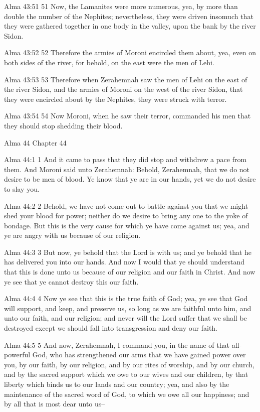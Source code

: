 Alma 43:51
 51 Now, the Lamanites were more numerous, yea, by more than
double the number of the Nephites; nevertheless, they were driven
insomuch that they were gathered together in one body in the
valley, upon the bank by the river Sidon.

Alma 43:52
 52 Therefore the armies of Moroni encircled them about, yea,
even on both sides of the river, for behold, on the east were the
men of Lehi.

Alma 43:53
 53 Therefore when Zerahemnah saw the men of Lehi on the east of
the river Sidon, and the armies of Moroni on the west of the
river Sidon, that they were encircled about by the Nephites, they
were struck with terror.

Alma 43:54
 54 Now Moroni, when he saw their terror, commanded his men that
they should stop shedding their blood.

Alma 44
Chapter 44

Alma 44:1
 1 And it came to pass that they did stop and withdrew a pace
from them. And Moroni said unto Zerahemnah: Behold, Zerahemnah,
that we do not desire to be men of blood. Ye know that ye are in
our hands, yet we do not desire to slay you.

Alma 44:2
 2 Behold, we have not come out to battle against you that we
might shed your blood for power; neither do we desire to bring
any one to the yoke of bondage. But this is the very cause for
which ye have come against us; yea, and ye are angry with us
because of our religion.

Alma 44:3
 3 But now, ye behold that the Lord is with us; and ye behold
that he has delivered you into our hands. And now I would that
ye should understand that this is done unto us because of our
religion and our faith in Christ. And now ye see that ye cannot
destroy this our faith.

Alma 44:4
 4 Now ye see that this is the true faith of God; yea, ye see
that God will support, and keep, and preserve us, so long as we
are faithful unto him, and unto our faith, and our religion; and
never will the Lord suffer that we shall be destroyed except we
should fall into transgression and deny our faith.

Alma 44:5
 5 And now, Zerahemnah, I command you, in the name of that
all-powerful God, who has strengthened our arms that we have
gained power over you, by our faith, by our religion, and by our
rites of worship, and by our church, and by the sacred support
which we owe to our wives and our children, by that liberty which
binds us to our lands and our country; yea, and also by the
maintenance of the sacred word of God, to which we owe all our
happiness; and by all that is most dear unto us--

